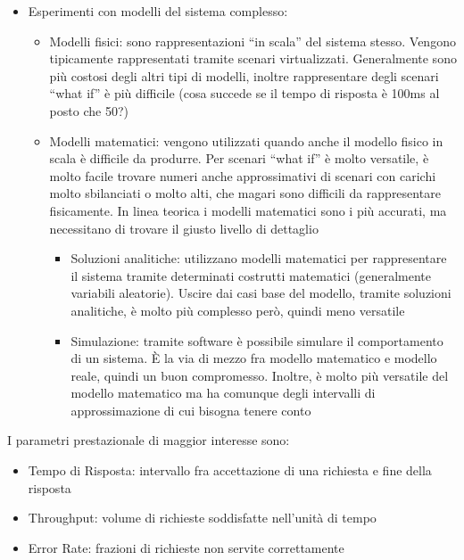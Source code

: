 \documentclass{article}
\begin{document}
\begin{itemize}
			\item Esperimenti con modelli del sistema complesso:
			\begin{itemize}
				\item Modelli fisici: sono rappresentazioni “in scala” del sistema stesso. Vengono tipicamente
				rappresentati tramite scenari virtualizzati. Generalmente sono più costosi degli altri tipi di
				modelli, inoltre rappresentare degli scenari “what if” è più difficile (cosa succede se il tempo
				di risposta è 100ms al posto che 50?)
				\item Modelli matematici: vengono utilizzati quando anche il modello fisico in scala è difficile da
				produrre. Per scenari “what if” è molto versatile, è molto facile trovare numeri anche
				approssimativi di scenari con carichi molto sbilanciati o molto alti, che magari sono difficili
				da rappresentare fisicamente. In linea teorica i modelli matematici sono i più
				accurati, ma necessitano di trovare il giusto livello di dettaglio
				\begin{itemize}
					\item Soluzioni analitiche: utilizzano modelli matematici per rappresentare il sistema tramite
					determinati costrutti matematici (generalmente variabili aleatorie). Uscire dai casi base
					del modello, tramite soluzioni analitiche, è molto più complesso però, quindi meno
					versatile
					\item Simulazione: tramite software è possibile simulare il comportamento di un sistema. È la via di mezzo fra modello matematico e modello reale, quindi un buon compromesso.
					Inoltre, è molto più versatile del modello matematico ma ha comunque degli intervalli di approssimazione di cui bisogna tenere conto
				\end{itemize}
			\end{itemize}
		\end{itemize}
		

		I parametri prestazionale di maggior interesse sono:
		
		\begin{itemize}
			\item Tempo di Risposta: intervallo fra accettazione di una richiesta e fine della risposta
			\item Throughput: volume di richieste soddisfatte nell'unità di tempo
			\item Error Rate: frazioni di richieste non servite correttamente
		\end{itemize}
		
\end{document}
